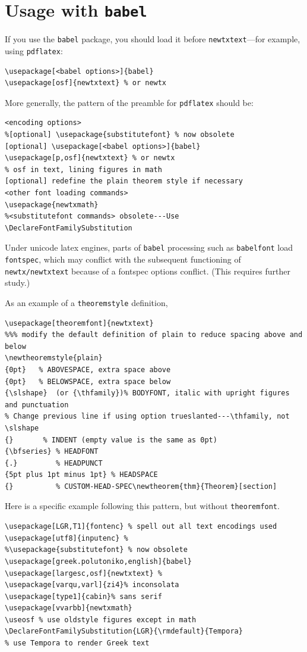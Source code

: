 \documentclass[\fsc]{article}
\theoremstyle{oldplain}
\theoremstyle{plain}
\begin{document}
\section{Usage with {\tt babel}}
If you use the {\tt babel} package, you should load it before {\tt newtxtext}---for example, using {\tt pdflatex}:
\begin{verbatim}
\usepackage[<babel options>]{babel}
\usepackage[osf]{newtxtext} % or newtx
\end{verbatim}
More generally, the pattern of the preamble for {\tt pdflatex} should be:
\begin{verbatim}
<encoding options>
%[optional] \usepackage{substitutefont} % now obsolete
[optional] \usepackage[<babel options>]{babel}
\usepackage[p,osf]{newtxtext} % or newtx
% osf in text, lining figures in math
[optional] redefine the plain theorem style if necessary
<other font loading commands>
\usepackage{newtxmath}
%<substitutefont commands> obsolete---Use \DeclareFontFamilySubstitution
\end{verbatim}
Under unicode latex engines, parts of {\tt babel} processing such as {\tt babelfont} load {\tt fontspec}, which may conflict with the subsequent functioning of {\tt newtx/newtxtext} because of a fontspec options conflict. (This requires further study.)

As an example of a {\tt theoremstyle} definition,
\begin{verbatim}
\usepackage[theoremfont]{newtxtext}
%%% modify the default definition of plain to reduce spacing above and below
\newtheoremstyle{plain}
{0pt}   % ABOVESPACE, extra space above
{0pt}   % BELOWSPACE, extra space below
{\slshape}  (or {\thfamily})% BODYFONT, italic with upright figures and punctuation
% Change previous line if using option trueslanted---\thfamily, not \slshape
{}       % INDENT (empty value is the same as 0pt)
{\bfseries} % HEADFONT
{.}         % HEADPUNCT
{5pt plus 1pt minus 1pt} % HEADSPACE
{}          % CUSTOM-HEAD-SPEC\newtheorem{thm}{Theorem}[section]
\end{verbatim}

Here is a specific example following this pattern, but without {\tt theoremfont}.
\begin{verbatim}
\usepackage[LGR,T1]{fontenc} % spell out all text encodings used
\usepackage[utf8]{inputenc} % 
%\usepackage{substitutefont} % now obsolete
\usepackage[greek.polutoniko,english]{babel}
\usepackage[largesc,osf]{newtxtext} % 
\usepackage[varqu,varl]{zi4}% inconsolata
\usepackage[type1]{cabin}% sans serif
\usepackage[vvarbb]{newtxmath}
\useosf % use oldstyle figures except in math
\DeclareFontFamilySubstitution{LGR}{\rmdefault}{Tempora} 
% use Tempora to render Greek text
\end{verbatim}
\end{document}
